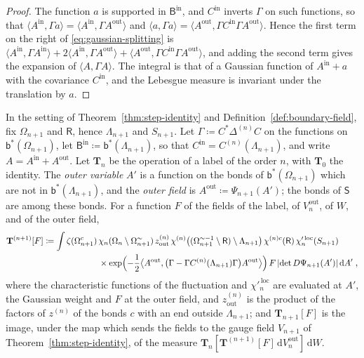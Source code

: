 \documentclass[11pt]{preprint}
\newcommand{\dd}{\mathrm{d}}
\DeclarePairedDelimiter{\abs}{\lvert}{\rvert}
\numberwithin{equation}{section}
\begin{document}
\begin{proof}
The function $a$ is supported in $\mathsf B^{\mathrm{in}}$, and $C^{\mathrm{in}}$ inverts $\Gamma$ on such functions, so that $\langle A^{\mathrm{in}}, \Gamma a\rangle = \langle A^{\mathrm{in}}, \Gamma A^{\mathrm{out}}\rangle$ and $\langle a, \Gamma a\rangle = \langle A^{\mathrm{out}}, \Gamma C^{\mathrm{in}}\Gamma A^{\mathrm{out}}\rangle$. Hence the first term on the right of \eqref{eq:gaussian-splitting} is $\langle A^{\mathrm{in}}, \Gamma A^{\mathrm{in}}\rangle + 2\langle A^{\mathrm{in}}, \Gamma A^{\mathrm{out}}\rangle + \langle A^{\mathrm{out}}, \Gamma C^{\mathrm{in}}\Gamma A^{\mathrm{out}}\rangle$, and adding the second term gives the expansion of $\langle A, \Gamma A\rangle$. The integral is that of a Gaussian function of $A^{\mathrm{in}} + a$ with the covariance $C^{\mathrm{in}}$, and the Lebesgue measure is invariant under the translation by $a$.
\end{proof}

\begin{definition}\label{def:step-operation}
In the setting of Theorem~\ref{thm:step-identity} and Definition~\ref{def:boundary-field}, fix $\Omega_{n+1}$ and $\mathsf R$, hence $\Lambda_{n+1}$ and $S_{n+1}$. Let $\Gamma \coloneqq C^*\Delta^{(n)}C$ on the functions on $\mathsf b^*(\Omega_{n+1})$, let $\mathsf B^{\mathrm{in}} \coloneqq \mathsf b^*(\Lambda_{n+1})$, so that $C^{\mathrm{in}} = C^{(n)}(\Lambda_{n+1})$, and write $A = A^{\mathrm{in}} + A^{\mathrm{out}}$. Let $\mathbf T_n$ be the operation of a label of the order $n$, with $\mathbf T_0$ the identity. The \emph{outer variable} $A'$ is a function on the bonds of $\mathsf b^*(\Omega_{n+1})$ which are not in $\mathsf b^*(\Lambda_{n+1})$, and the \emph{outer field} is $A^{\mathrm{out}} \coloneqq \Psi_{n+1}(A')$; the bonds of $\mathsf S$ are among these bonds. For a function $F$ of the fields of the label, of $V^{\mathrm{out}}_n$, of $W$, and of the outer field,
\begin{equation}\label{eq:step-operation}
\begin{aligned}
    \mathbf T^{(n+1)}[F] \coloneqq \int\zeta(\Omega^c_{n+1})\,&\chi_n(\Omega_n \setminus \Omega^\sim_{n+1})\,z^{(n)}_{\mathrm{out}}\,\chi^{(n)}\bigl((\Omega^{\sim-1}_{n+1} \setminus \mathsf R) \setminus \Lambda_{n+1}\bigr)\,\chi^{(n)c}(\mathsf R)\,\chi'^{\,\mathrm{loc}}_n(S_{n+1})\\
    &\times\exp\Bigl(-\frac{1}{2}\bigl\langle A^{\mathrm{out}}, \bigl(\Gamma - \Gamma C^{(n)}(\Lambda_{n+1})\Gamma\bigr)A^{\mathrm{out}}\bigr\rangle\Bigr)\,F\,\abs{\det D\Psi_{n+1}(A')}\,\dd A'\;,
\end{aligned}
\end{equation}
where the characteristic functions of the fluctuation and $\chi'^{\,\mathrm{loc}}_n$ are evaluated at $A'$, the Gaussian weight and $F$ at the outer field, and $z^{(n)}_{\mathrm{out}}$ is the product of the factors of $z^{(n)}$ of the bonds $c$ with an end outside $\Lambda_{n+1}$; and $\mathbf T_{n+1}[F]$ is the image, under the map which sends the fields to the gauge field $V_{n+1}$ of Theorem~\ref{thm:step-identity}, of the measure $\mathbf T_n[\mathbf T^{(n+1)}[F]\,\dd V^{\mathrm{out}}_n]\,\dd W$.
\end{definition}
\end{document}
